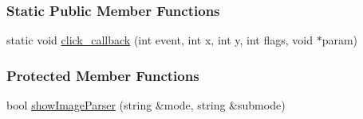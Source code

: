 \subsubsection*{Static Public Member Functions}
\begin{DoxyCompactItemize}
\item 
static void \hyperlink{group__agentDetector_aa103b25b46ba3083c5c5dfe2b055306d}{click\+\_\+callback} (int event, int x, int y, int flags, void $\ast$param)
\end{DoxyCompactItemize}
\subsubsection*{Protected Member Functions}
\begin{DoxyCompactItemize}
\item 
bool \hyperlink{group__agentDetector_a157b0882a6adf6678897f913c96de2f8}{show\+Image\+Parser} (string \&mode, string \&submode)
\end{DoxyCompactItemize}
